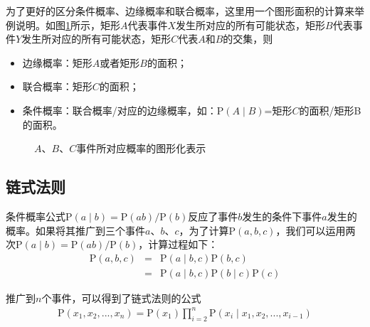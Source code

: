 \parinterval 为了更好的区分条件概率、边缘概率和联合概率，这里用一个图形面积的计算来举例说明。如图\ref{fig:2-4}所示，矩形$A$代表事件$X$发生所对应的所有可能状态，矩形$B$代表事件$Y$发生所对应的所有可能状态，矩形$C$代表$A$和$B$的交集，则

\begin{itemize}
\vspace{0.5em}
\item 边缘概率：矩形$A$或者矩形$B$的面积；
\vspace{0.5em}
\item 联合概率：矩形$C$的面积；
\vspace{0.5em}
\item 条件概率：联合概率/对应的边缘概率，如：$\textrm{P}(A \mid B)$=矩形$C$的面积/矩形B的面积。
\vspace{0.5em}
\end{itemize}

\begin{figure}[htp]
\centering

\caption{$A$、$B$、$C$事件所对应概率的图形化表示}
\label{fig:2-4}
\end{figure}


\subsection{链式法则}

\parinterval 条件概率公式$\textrm{P}(a \mid b)=\textrm{P}(ab)/\textrm{P}(b)$反应了事件$b$发生的条件下事件$a$发生的概率。如果将其推广到三个事件$a$、$b$、$c$，为了计算$\textrm{P}(a,b,c)$，我们可以运用两次$\textrm{P}(a \mid b)=\textrm{P}(ab)/\textrm{P}(b)$，计算过程如下：
\begin{eqnarray}
\textrm{P}(a,b,c) & = & \textrm{P}(a \mid b ,c)\textrm{P}(b,c) \nonumber \\
                           & = & \textrm{P}(a \mid b,c)\textrm{P}(b \mid c)\textrm{P}(c)
\label{eq:2-5}
\end{eqnarray}

\parinterval 推广到$n$个事件，可以得到了链式法则的公式
\begin{eqnarray}
\textrm{P}(x_1,x_2,...,x_n)=\textrm{P}(x_1) \prod_{i=2}^n \textrm{P}(x_i \mid x_1,x_2,...,x_{i-1})
\label{eq:2-6}
\end{eqnarray}

